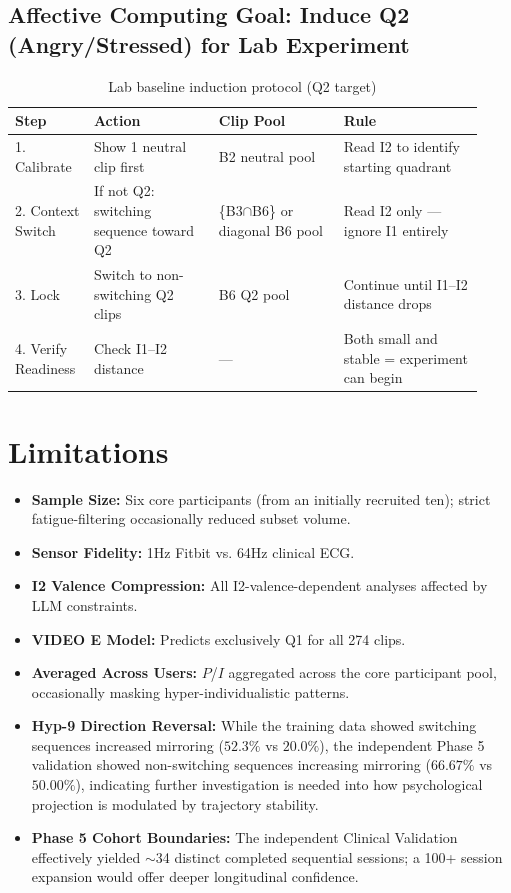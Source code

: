 \documentclass[11pt, a4paper]{report}
\begin{document}
\subsection{Affective Computing Goal: Induce Q2 (Angry/Stressed) for Lab Experiment}

\begin{table}[H]
\centering
\small
\caption{Lab baseline induction protocol (Q2 target)}
\begin{tabular}{@{}p{0.15\linewidth}p{0.25\linewidth}p{0.25\linewidth}p{0.28\linewidth}@{}}
\toprule
\textbf{Step} & \textbf{Action} & \textbf{Clip Pool} & \textbf{Rule} \\
\midrule
1. Calibrate & Show 1 neutral clip first & B2 neutral pool & Read I2 to identify starting quadrant \\
2. Context Switch & If not Q2: switching sequence toward Q2 & \{B3$\cap$B6\} or diagonal B6 pool & Read I2 only --- ignore I1 entirely \\
3. Lock & Switch to non-switching Q2 clips & B6 Q2 pool & Continue until I1--I2 distance drops \\
4. Verify Readiness & Check I1--I2 distance & --- & Both small and stable = experiment can begin \\
\bottomrule
\end{tabular}
\end{table}

\section{Limitations}
\begin{itemize}
    \item \textbf{Sample Size:} Six core participants (from an initially recruited ten); strict fatigue-filtering occasionally reduced subset volume.
    \item \textbf{Sensor Fidelity:} 1Hz Fitbit vs. 64Hz clinical ECG.
    \item \textbf{I2 Valence Compression:} All I2-valence-dependent analyses affected by LLM constraints.
    \item \textbf{VIDEO E Model:} Predicts exclusively Q1 for all 274 clips.
    \item \textbf{Averaged Across Users:} $P$/$I$ aggregated across the core participant pool, occasionally masking hyper-individualistic patterns.
    \item \textbf{Hyp-9 Direction Reversal:} While the training data showed switching sequences increased mirroring ($52.3\%$ vs $20.0\%$), the independent Phase 5 validation showed non-switching sequences increasing mirroring ($66.67\%$ vs $50.00\%$), indicating further investigation is needed into how psychological projection is modulated by trajectory stability.
    \item \textbf{Phase 5 Cohort Boundaries:} The independent Clinical Validation effectively yielded $\sim$34 distinct completed sequential sessions; a 100+ session expansion would offer deeper longitudinal confidence.
\end{itemize}
\end{document}
